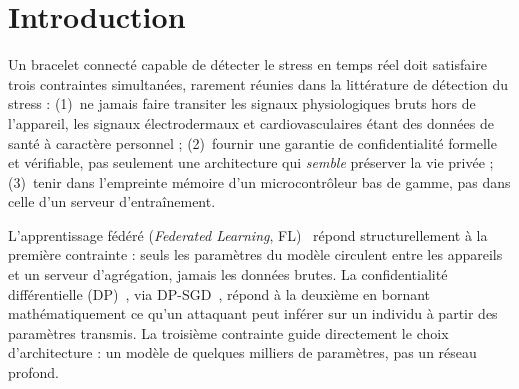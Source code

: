 \documentclass{acmart}
\begin{document}
\begin{abstract}
{\bf Conclusions:}
Sur un protocole de laboratoire standardisé, l'apprentissage fédéré avec
confidentialité différentielle n'entraîne aucun coût de performance
statistiquement mesurable face au centralisé, et une personnalisation légère
(une seule couche non agrégée) suffit à le dépasser significativement, tout en
conservant un modèle déployable en 5,32~Ko. Ce résultat positionne le FL
personnalisé non pas comme un compromis coûteux imposé par la confidentialité,
mais comme une architecture au moins aussi performante que l'alternative
centralisée pourtant non conforme aux principes de minimisation des données
pour ce type de signal. Au-delà de WESAD, ce travail illustre une leçon
méthodologique transférable : la métrique groupée sur des clients
mono-classe ne se contente pas de masquer un écart réel entre conditions,
elle peut en \textbf{inventer un dans le mauvais sens} (ici, FedProx+DP
paraît significativement meilleur que le centralisé sur la métrique
groupée, alors que l'écart disparaît complètement une fois restreint aux
clients informatifs) ; croiser systématiquement métrique groupée et métrique
restreinte aux clients réellement informatifs reste nécessaire quel que soit
le sens apparent de l'écart mesuré.
\end{abstract}


\maketitle

\section{Introduction}

Un bracelet connecté capable de détecter le stress en temps réel doit
satisfaire trois contraintes simultanées, rarement réunies dans la
littérature de détection du stress : (1)~ne jamais faire transiter les
signaux physiologiques bruts hors de l'appareil, les signaux électrodermaux
et cardiovasculaires étant des données de santé à caractère personnel ;
(2)~fournir une garantie de confidentialité formelle et vérifiable, pas
seulement une architecture qui \emph{semble} préserver la vie privée ;
(3)~tenir dans l'empreinte mémoire d'un microcontrôleur bas de gamme, pas
dans celle d'un serveur d'entraînement.

L'apprentissage fédéré (\textit{Federated
Learning}, FL)~\cite{mcmahan2017communication} répond structurellement à la
première contrainte : seuls les paramètres du modèle circulent entre les
appareils et un serveur d'agrégation, jamais les données brutes. La
confidentialité différentielle (DP)~\cite{dwork2014foundations}, via
DP-SGD~\cite{abadi2016deep}, répond à la deuxième en bornant mathématiquement
ce qu'un attaquant peut inférer sur un individu à partir des paramètres
transmis. La troisième contrainte guide directement le choix d'architecture :
un modèle de quelques milliers de paramètres, pas un réseau profond.
\end{document}
